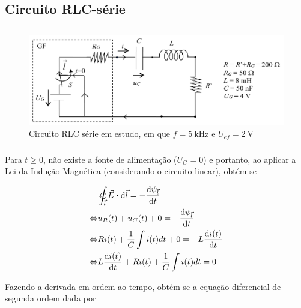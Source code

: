 \documentclass[a4paper, titlepage, portuguese]{article}
\newcommand{\eq}{\Leftrightarrow} %
\begin{document}
	\subsubsection{}

	\subsubsection{}

	\subsection{Circuito RLC-série}
	\subsection{}
		\begin{figure}[H]
			\centering
			\includegraphics[width=0.7\linewidth]{rlc.png}
			\caption{Circuito RLC série em estudo, em que $f = \SI{5}{\kilo\hertz}$ e $U_{ef} = \SI{2}{\volt}$}
			\label{fig:circ_rlc}
		\end{figure}
	\subsubsection{}

		\par
		Para $t \geq 0$, não existe a fonte de alimentação ($U_G = 0$) e portanto, ao aplicar a Lei da Indução Magnética (considerando o circuito linear), obtém-se

		\begin{align*}
			&\ointclockwise_{\vec{l}} \vec{E} \vdot \dd{\vec{l}} = - \dv{\psi_{\vec{l}}}{t} \\ \eq
			&u_R(t) + u_C(t) + 0 = - \dv{\psi_{\vec{l}}}{t} \\ \eq
			&Ri(t) + \frac{1}{C} \int i(t) dt + 0 = -L \dv{i(t)}{t} \\ \eq
			&L \dv{i(t)}{t} + Ri(t) + \frac{1}{C} \int i(t) dt = 0 \\
		\end{align*}

		Fazendo a derivada em ordem ao tempo, obtém-se a equação diferencial de segunda ordem dada por
\end{document}
